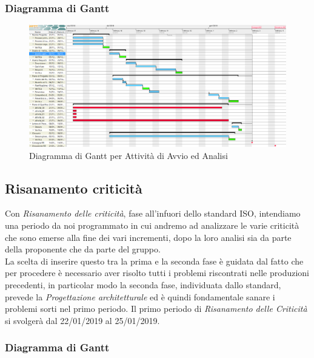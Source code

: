 \begin{landscape}
\subsubsection{Diagramma di Gantt}
\begin{figure}[h]
	\centering
  		\includegraphics[width=1.0\linewidth]{./images/AvvioAnalisi.png}
  		\caption{Diagramma di Gantt per Attività di Avvio ed Analisi}
  		\label{fig:Gantt Avvio ed Analisi}
\end{figure}
\end{landscape}

\subsection{Risanamento criticità}

Con \textit{Risanamento delle criticità}, fase all'infuori dello standard ISO, intendiamo una periodo da noi programmato in cui andremo ad analizzare le varie criticità che sono emerse alla fine dei vari incrementi, dopo la loro analisi sia da parte della proponente che da parte del gruppo. \\
La scelta di inserire questo tra la prima e la seconda fase è guidata dal fatto che per procedere è necessario aver risolto tutti i problemi riscontrati nelle produzioni precedenti, in particolar modo la seconda fase, individuata dallo standard, prevede la \textit{Progettazione architetturale} ed è quindi fondamentale sanare i problemi sorti nel primo periodo. 
Il primo periodo di \textit{Risanamento delle Criticità} si svolgerà dal 22/01/2019 al 25/01/2019.

\subsubsection{Diagramma di Gantt}

